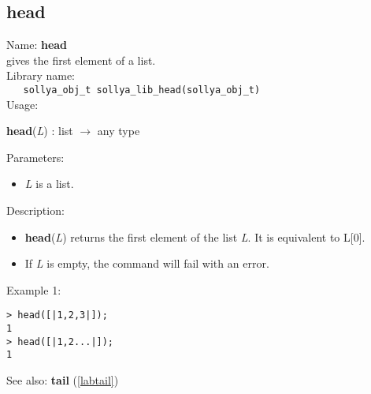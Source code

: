 \subsection{head}
\label{labhead}
\noindent Name: \textbf{head}\\
\phantom{aaa}gives the first element of a list.\\[0.2cm]
\noindent Library name:\\
\verb|   sollya_obj_t sollya_lib_head(sollya_obj_t)|\\[0.2cm]
\noindent Usage: 
\begin{center}
\textbf{head}(\emph{L}) : \textsf{list} $\rightarrow$ \textsf{any type}\\
\end{center}
Parameters: 
\begin{itemize}
\item \emph{L} is a list.
\end{itemize}
\noindent Description: \begin{itemize}

\item \textbf{head}(\emph{L}) returns the first element of the list \emph{L}. It is equivalent
   to L[0].

\item If \emph{L} is empty, the command will fail with an error.
\end{itemize}
\noindent Example 1: 
\begin{center}\begin{minipage}{15cm}\begin{Verbatim}[frame=single]
> head([|1,2,3|]);
1
> head([|1,2...|]);
1
\end{Verbatim}
\end{minipage}\end{center}
See also: \textbf{tail} (\ref{labtail})
